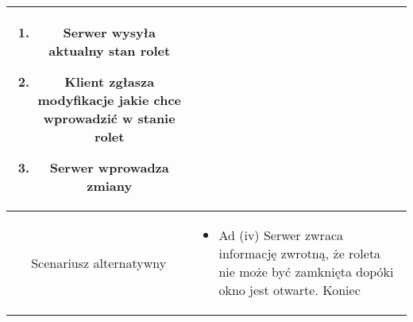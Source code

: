 \documentclass{article}
\begin{document}
\begin{enumerate}
\begin{enumerate}
\begin{table}[H]
\begin{tabular}{|c|p{7cm}|}
\begin{enumerate}
\item Serwer wysyła aktualny stan rolet

\item Klient zgłasza modyfikacje jakie chce wprowadzić w stanie rolet

\item Serwer wprowadza zmiany\end{enumerate} \\
						\hline
						Scenariusz alternatywny & \begin{itemize}\item Ad (iv) Serwer zwraca informację zwrotną, że roleta nie może być zamknięta dopóki okno jest otwarte. Koniec\end{itemize}                                                                                                                 \\
						\hline
					\end{tabular}
				\end{table}


\end{enumerate}
\end{enumerate}
\end{document}
